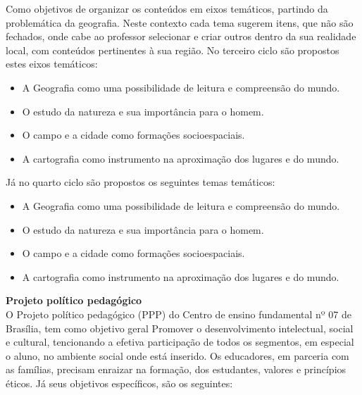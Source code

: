 Como objetivos de organizar os conteúdos em eixos temáticos, partindo da problemática da geografia. Neste contexto cada tema sugerem itens, que não são fechados, onde cabe ao professor selecionar e criar outros dentro da sua realidade local, com conteúdos pertinentes à sua região.
No terceiro ciclo são propostos estes eixos temáticos:

\begin{itemize}
\item A Geografia como uma possibilidade de leitura e compreensão do mundo.
\item O estudo da natureza e sua importância para o homem.
\item O campo e a cidade como formações socioespaciais.
\item A cartografia como instrumento na aproximação dos lugares e do mundo.
\end{itemize}
\hspace{1.5cm}
Já no quarto ciclo são propostos os seguintes temas temáticos:
\begin{itemize}
\item A Geografia como uma possibilidade de leitura e compreensão do mundo.
\item O estudo da natureza e sua importância para o homem.
\item O campo e a cidade como formações socioespaciais.
\item A cartografia como instrumento na aproximação dos lugares e do mundo.
\end{itemize}

\textbf{Projeto político pedagógico}\\

O Projeto político pedagógico (PPP) do Centro de ensino fundamental nº 07 de Brasília, tem como objetivo geral Promover o desenvolvimento intelectual, social e cultural, tencionando a efetiva participação de todos os segmentos, em especial o aluno, no ambiente social onde está inserido. Os educadores, em parceria com as famílias, precisam enraizar na formação, dos estudantes, valores e princípios éticos. Já seus objetivos específicos, são os seguintes:

